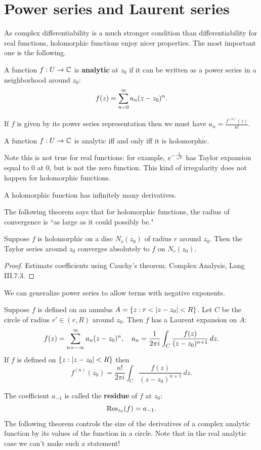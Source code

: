 \section{Power series and Laurent series}
As complex differentiability is a much stronger condition than differentiability for real functions, holomorphic functions enjoy nicer properties. The most important one is the following.
\begin{df}
A function $f:U\to \mathbb{C}$ is \textbf{analytic} at $z_0$ if it can be written as a power series in a neighborhood around $z_0$:
\[
f(z)=\sum_{n=0}^{\infty} a_n(z-z_0)^n.
\]
\end{df}
If $f$ is given by its power series representation then we must have $a_n=\frac{f^{(n)}(z)}{n!}$.
\begin{thm}
A function $f:U\to \mathbb{C}$ is analytic iff and only iff it is holomorphic.
\end{thm}
Note this is not true for real functions: for example, $e^{-\frac{1}{x^2}}$ has Taylor expansion equal to 0 at 0, but is not the zero function. This kind of irregularity does not happen for holomorphic functions.
\begin{cor}
A holomorphic function has infinitely many derivatives.
\end{cor}
The following theorem says that for holomorphic functions, the radius of convergence is ``as large as it could possibly be."
\begin{thm}
Suppose $f$ is holomorphic on a disc $N_r(z_0)$ of radius $r$ around $z_0$. Then the Taylor series around $z_0$ converges absolutely to $f$ on $N_r(z_0)$.
\end{thm}
\begin{proof}
Estimate coefficients using Cauchy's theorem. Complex Analysis, Lang III.7.3.
\end{proof}
We can generalize power series to allow terms with negative exponents.
\begin{thm}
Suppose $f$ is defined on an annulus $A=\set{z}{r<|z-z_0|< R}$. Let $C$ be the circle of radius $r'\in(r,R)$ around $z_0$. Then $f$ has a Laurent expansion on $A$:
\[
f(z)=\sum_{n=-\infty}^{\infty} a_n(z-z_0)^n,\quad a_n=\frac{1}{2\pi i}\int_{C} \frac{f(z)}{(z-z_0)^{n+1}}\,dz.
\]
If $f$ is defined on $\left\{{z}:{|z-z_0|<R}\right\}$ then 
\[f^{(n)}(z_0)=\frac{n!}{2\pi i}\int_{C} \frac{f(z)}{(z-z_0)^{n+1}}\,dz.\]
\end{thm}
The coefficient $a_{-1}$ is called the \textbf{residue} of $f$ at $z_0$:
\[
\operatorname{Res}_{z_0}(f)=a_{-1}.
\]
The following theorem controls the size of the derivatives of a complex analytic function by its values of the function in a circle. Note that in the real analytic case we can't make such a statement!
